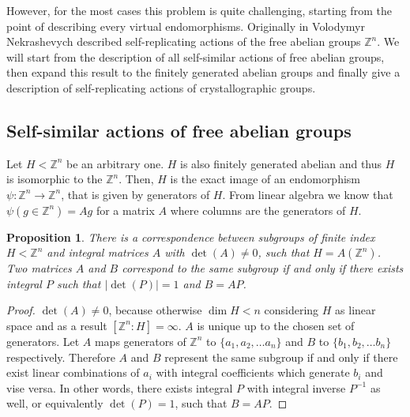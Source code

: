 \documentclass[a4paper,12pt]{amsart}
\newtheorem{proposition}[theorem]{Proposition}
\theoremstyle{definition}
\begin{document}
	
	
	However, for the most cases this problem is quite challenging, starting from the point of describing every virtual endomorphisms. Originally in \cite{Nekrashevych: 1/2-endomorphisms} Volodymyr Nekrashevych described self-replicating actions of the free abelian groups $\mathbb{Z}^n$. We will start from the description of all self-similar actions of free abelian groups, then expand this result to the finitely generated abelian groups and finally give a description of self-replicating actions of crystallographic groups.
	
	
	\subsection{Self-similar actions of free abelian groups}
	
	Let $H < \mathbb{Z}^n$ be an arbitrary one. $H$ is also finitely generated abelian and thus $H$ is isomorphic to the $\mathbb{Z}^n$. Then, $H$ is the exact image of an endomorphism $\psi :\mathbb{Z}^n \rightarrow \mathbb{Z}^n$, that is given by generators of $H$. From linear algebra we know that $\psi(g \in \mathbb{Z}^n ) = Ag$ for a matrix $A$ where columns are the generators of $H$. 
	
	\begin{proposition}\label{proposition:subgroups vs matrices}
		There is a correspondence between subgroups of finite index $H < \mathbb{Z}^n$ and integral matrices $A$ with $\det(A) \neq 0$, such that $H = A (\mathbb{Z}^n)$. Two matrices $A$ and $B$ correspond to the same subgroup if and only if there exists integral $P$ such that $|\det(P)| = 1$ and $B = AP$. 
		
	\end{proposition}
	
	\begin{proof}
		$\det(A) \ne 0$, because otherwise $\dim H < n$ considering $H$ as linear space and as a result $[\mathbb{Z}^n: H] = \infty$. $A$ is unique up to the chosen set of generators. Let $A$ maps generators of $\mathbb{Z}^n$ to $\{a_1, a_2, \dots a_n\}$ and $B$ to $\{b_1, b_2, \dots b_n\}$ respectively. Therefore $A$ and $B$ represent the same subgroup if and only if there exist linear combinations of $a_i$ with integral coefficients which generate $b_i$ and vise versa. In other words, there exists integral $P$ with integral inverse $P^{-1}$ as well, or equivalently $\det(P) = 1$, such that $B = AP$. 
	\end{proof}
	
\end{document}
